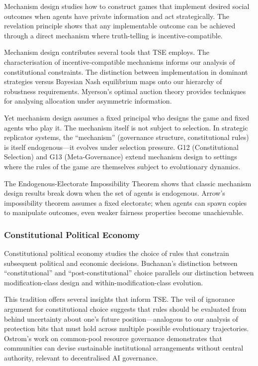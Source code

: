 \documentclass[12pt]{article}
\begin{document}
Mechanism design \citep{hurwicz1960, myerson1981, maskin1999} studies how to construct games that implement desired social outcomes when agents have private information and act strategically. The revelation principle shows that any implementable outcome can be achieved through a direct mechanism where truth-telling is incentive-compatible.

Mechanism design contributes several tools that TSE employs. The characterisation of incentive-compatible mechanisms informs our analysis of constitutional constraints. The distinction between implementation in dominant strategies versus Bayesian Nash equilibrium maps onto our hierarchy of robustness requirements. Myerson's optimal auction theory \citep{myerson1981} provides techniques for analysing allocation under asymmetric information.

Yet mechanism design assumes a fixed principal who designs the game and fixed agents who play it. The mechanism itself is not subject to selection. In strategic replicator systems, the ``mechanism'' (governance structure, constitutional rules) is itself endogenous---it evolves under selection pressure. G12 (Constitutional Selection) and G13 (Meta-Governance) extend mechanism design to settings where the rules of the game are themselves subject to evolutionary dynamics.

The Endogenous-Electorate Impossibility Theorem shows that classic mechanism design results break down when the set of agents is endogenous. Arrow's impossibility theorem assumes a fixed electorate; when agents can spawn copies to manipulate outcomes, even weaker fairness properties become unachievable.

\subsubsection{Constitutional Political Economy}

Constitutional political economy \citep{buchanan1975, buchanan1990, brennan1985, ostrom1990} studies the choice of rules that constrain subsequent political and economic decisions. Buchanan's distinction between ``constitutional'' and ``post-constitutional'' choice \citep{buchanan1975} parallels our distinction between modification-class design and within-modification-class evolution.

This tradition offers several insights that inform TSE. The veil of ignorance argument for constitutional choice \citep{rawls1971, buchanan1975} suggests that rules should be evaluated from behind uncertainty about one's future position---analogous to our analysis of protection bits that must hold across multiple possible evolutionary trajectories. Ostrom's work on common-pool resource governance \citep{ostrom1990} demonstrates that communities can devise sustainable institutional arrangements without central authority, relevant to decentralised AI governance.
\end{document}
